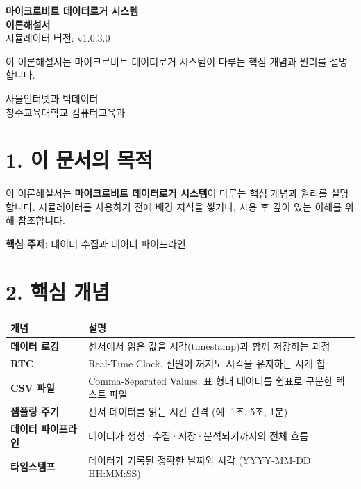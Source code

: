 \documentclass[11pt,a4paper]{article}
\begin{document}
\begin{titlepage}
\centering
\vspace*{3cm}
{\Huge\bfseries\color{primary} 마이크로비트 데이터로거 시스템}\\[0.5cm]
{\Huge\bfseries\color{primary} 이론해설서}
\\[1.5cm]
{\Large 시뮬레이터 버전: v1.0.3.0}
\\[2cm]
\begin{tcolorbox}[summarybox]
\centering
{\large 이 이론해설서는 마이크로비트 데이터로거 시스템이 다루는 핵심 개념과 원리를 설명합니다.}
\end{tcolorbox}
\vfill
{\large 사물인터넷과 빅데이터}\\[0.3cm]
{\large 청주교육대학교 컴퓨터교육과}
\vspace{1cm}
\end{titlepage}

\section*{1. 이 문서의 목적}

이 이론해설서는 \textbf{마이크로비트 데이터로거 시스템}이 다루는 핵심 개념과 원리를 설명합니다. 시뮬레이터를 사용하기 전에 배경 지식을 쌓거나, 사용 후 깊이 있는 이해를 위해 참조합니다.


\begin{tcolorbox}[summarybox]
\textbf{핵심 주제}: 데이터 수집과 데이터 파이프라인

\end{tcolorbox}


\section*{2. 핵심 개념}

\begin{center}
\renewcommand{\arraystretch}{1.4}
\begin{tabular}{|p{3.6cm}|p{11.4cm}|}
\hline
\rowcolor{tableheader}
\textbf{개념} & \textbf{설명} \\
\hline
\textbf{데이터 로깅} & 센서에서 읽은 값을 시각(timestamp)과 함께 저장하는 과정 \\
\hline
\textbf{RTC} & Real-Time Clock. 전원이 꺼져도 시각을 유지하는 시계 칩 \\
\hline
\textbf{CSV 파일} & Comma-Separated Values. 표 형태 데이터를 쉼표로 구분한 텍스트 파일 \\
\hline
\textbf{샘플링 주기} & 센서 데이터를 읽는 시간 간격 (예: 1초, 5초, 1분) \\
\hline
\textbf{데이터 파이프라인} & 데이터가 생성·수집·저장·분석되기까지의 전체 흐름 \\
\hline
\textbf{타임스탬프} & 데이터가 기록된 정확한 날짜와 시각 (YYYY-MM-DD HH:MM:SS) \\
\hline
\end{tabular}
\end{center}
\end{document}
